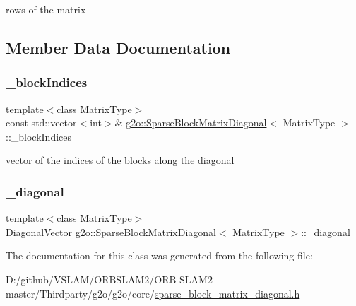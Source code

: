 rows of the matrix 



\subsection{Member Data Documentation}
\mbox{\label{classg2o_1_1_sparse_block_matrix_diagonal_a12ca3362997c3ca21c8b2a203177485e}} 
\subsubsection{\texorpdfstring{\+\_\+block\+Indices}{\_blockIndices}}
{\footnotesize\ttfamily template$<$class Matrix\+Type$>$ \\
const std\+::vector$<$int$>$\& \mbox{\hyperlink{classg2o_1_1_sparse_block_matrix_diagonal}{g2o\+::\+Sparse\+Block\+Matrix\+Diagonal}}$<$ Matrix\+Type $>$\+::\+\_\+block\+Indices\hspace{0.3cm}{\ttfamily [protected]}}



vector of the indices of the blocks along the diagonal 

\mbox{\label{classg2o_1_1_sparse_block_matrix_diagonal_a0679df785f9e7b79a1e9dfe623af5341}} 
\subsubsection{\texorpdfstring{\+\_\+diagonal}{\_diagonal}}
{\footnotesize\ttfamily template$<$class Matrix\+Type$>$ \\
\mbox{\hyperlink{classg2o_1_1_sparse_block_matrix_diagonal_a2eb7fc4130fac5c499b57f3bec855812}{Diagonal\+Vector}} \mbox{\hyperlink{classg2o_1_1_sparse_block_matrix_diagonal}{g2o\+::\+Sparse\+Block\+Matrix\+Diagonal}}$<$ Matrix\+Type $>$\+::\+\_\+diagonal\hspace{0.3cm}{\ttfamily [protected]}}



The documentation for this class was generated from the following file\+:\begin{DoxyCompactItemize}
\item 
D\+:/github/\+V\+S\+L\+A\+M/\+O\+R\+B\+S\+L\+A\+M2/\+O\+R\+B-\/\+S\+L\+A\+M2-\/master/\+Thirdparty/g2o/g2o/core/\mbox{\hyperlink{sparse__block__matrix__diagonal_8h}{sparse\+\_\+block\+\_\+matrix\+\_\+diagonal.\+h}}\end{DoxyCompactItemize}
